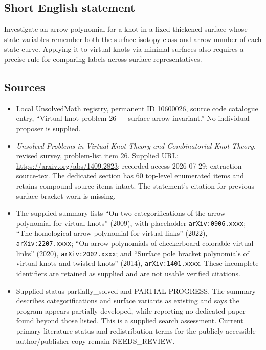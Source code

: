 \documentclass[11pt]{article}
\begin{document}
\subsection{Short English statement}
Investigate an arrow polynomial for a knot in a fixed thickened surface whose state variables remember both the surface isotopy class and arrow number of each state curve. Applying it to virtual knots via minimal surfaces also requires a precise rule for comparing labels across surface representatives.
\subsection{Sources}
\begin{itemize}
\item Local UnsolvedMath registry, permanent ID 10600026, source code catalogue entry, ``Virtual-knot problem 26 --- surface arrow invariant.'' No individual proposer is supplied.
\item \emph{Unsolved Problems in Virtual Knot Theory and Combinatorial Knot Theory}, revised survey, problem-list item 26. Supplied URL: \url{https://arxiv.org/abs/1409.2823}; recorded access 2026-07-29; extraction source-tex. The dedicated section has 60 top-level enumerated items and retains compound source items intact. The statement's citation for previous surface-bracket work is missing.
\item The supplied summary lists ``On two categorifications of the arrow polynomial for virtual knots'' (2009), with placeholder \texttt{arXiv:0906.xxxx}; ``The homological arrow polynomial for virtual links'' (2022), \texttt{arXiv:2207.xxxx}; ``On arrow polynomials of checkerboard colorable virtual links'' (2020), \texttt{arXiv:2002.xxxx}; and ``Surface pole bracket polynomials of virtual knots and twisted knots'' (2014), \texttt{arXiv:1401.xxxx}. These incomplete identifiers are retained as supplied and are not usable verified citations.
\item Supplied status partially\_solved and PARTIAL-PROGRESS. The summary describes categorifications and surface variants as existing and says the program appears partially developed, while reporting no dedicated paper found beyond those listed. This is a supplied search assessment. Current primary-literature status and redistribution terms for the publicly accessible author/publisher copy remain NEEDS\_REVIEW.
\end{itemize}
\end{document}
